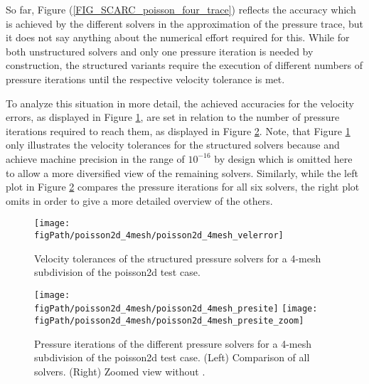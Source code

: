 So far, Figure (\ref{FIG_SCARC_poisson_four_trace}) reflects the accuracy which is achieved by the different solvers in the approximation of the pressure trace, but it does not say anything about the numerical effort required for this.
While for both unstructured solvers \uglmat{} and \uscarc{} only one pressure iteration is needed by construction, the structured variants require the execution of different numbers of pressure iterations until the respective velocity tolerance is met. 

To analyze this situation in more detail,  the achieved accuracies for the velocity errors, as displayed in Figure \ref{FIG_SCARC_poisson_four_velerror}, are set in relation to the number of pressure iterations required to reach them, as displayed in Figure \ref{FIG_SCARC_poisson_four_presite}.
Note, that Figure \ref{FIG_SCARC_poisson_four_velerror} only illustrates the velocity tolerances for the structured solvers because \uglmat{} and \uscarc{} achieve machine precision in the range of $10^{-16}$ by design which is omitted here to allow a more diversified view of the remaining solvers. Similarly, while the left plot in Figure \ref{FIG_SCARC_poisson_four_presite} compares the pressure iterations for all six solvers, the right plot omits \ffttight{} in order to give a more detailed overview of the others.

\begin{figure}[h]
\begin{center}
\texttt{[image: \\figPath/poisson2d\_4mesh/poisson2d\_4mesh\_velerror]}\\
\end{center}
\caption[Velocity tolerances of the structured pressure solvers in case of the 4-mesh poisson2d test case]{Velocity tolerances of the structured pressure solvers for a 4-mesh subdivision of the {\ct poisson2d} test case.}
\label{FIG_SCARC_poisson_four_velerror}
\end{figure}

\begin{figure}[h]
\begin{center}
\texttt{[image: \\figPath/poisson2d\_4mesh/poisson2d\_4mesh\_presite]}
\texttt{[image: \\figPath/poisson2d\_4mesh/poisson2d\_4mesh\_presite\_zoom]}
\end{center}
\caption[Pressure iterations of the different pressure solvers for {\ct poisson2d} with 4 meshes]{Pressure iterations of the different pressure solvers for a 4-mesh subdivision of the {\ct poisson2d} test case.  (Left) Comparison of all solvers. (Right) Zoomed view  without \ffttight{}.}
\label{FIG_SCARC_poisson_four_presite}
\end{figure}

